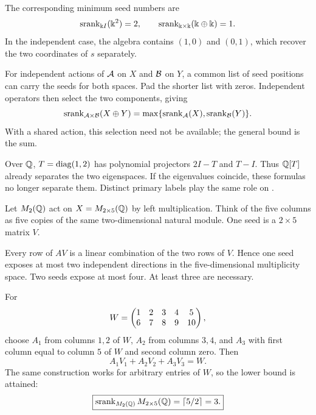 
The corresponding minimum seed numbers are
\[
\srank_{\kk I}(\kk^2)=2,
\qquad
\srank_{\kk\times\kk}(\kk\oplus\kk)=1.
\]
In the independent case, the algebra contains $(1,0)$ and $(0,1)$, which recover the two coordinates of $s$ separately.

For independent actions of $\AA$ on $X$ and $\BB$ on $Y$, a common list of seed positions can carry the seeds for both spaces. Pad the shorter list with zeros. Independent operators then select the two components, giving
\[
\srank_{\AA\times\BB}(X\oplus Y)
=\max\{\srank_{\AA}(X),\srank_{\BB}(Y)\}.
\]
With a shared action, this selection need not be available; the general bound is the sum.

Over $\QQ$, $T=\diag(1,2)$ has polynomial projectors $2I-T$ and $T-I$. Thus $\QQ[T]$ already separates the two eigenspaces. If the eigenvalues coincide, these formulas no longer separate them. Distinct primary labels play the same role on .


Let $M_2(\QQ)$ act on $X=M_{2\times5}(\QQ)$ by left multiplication. Think of the five columns as five copies of the same two-dimensional natural module. One seed is a $2\times5$ matrix $V$.

Every row of $AV$ is a linear combination of the two rows of $V$. Hence one seed exposes at most two independent directions in the five-dimensional multiplicity space. Two seeds expose at most four. At least three are necessary.


For
\[
W=\mat{1&2&3&4&5\\6&7&8&9&10},
\]
choose $A_1$ from columns $1,2$ of $W$, $A_2$ from columns $3,4$, and $A_3$ with first column equal to column $5$ of $W$ and second column zero. Then
\[
A_1V_1+A_2V_2+A_3V_3=W.
\]
The same construction works for arbitrary entries of $W$, so the lower bound is attained:
\[
\boxed{\srank_{M_2(\QQ)}M_{2\times5}(\QQ)=\lceil5/2\rceil=3.}
\]


